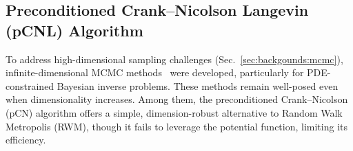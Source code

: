\subsection{Preconditioned Crank–Nicolson Langevin (pCNL) Algorithm}
\label{sec:methods:pcn}
To address high-dimensional sampling challenges (Sec.~\ref{sec:backgounds:mcmc}), infinite-dimensional MCMC methods~\cite{Cotter_2013pcnl, Beskos_2017geometricMCMC, doi:10.1142/S0219493708002378pcnlDiffusionBridge} were developed, particularly for PDE-constrained Bayesian inverse problems. These methods remain well-posed even when dimensionality increases. Among them, the preconditioned Crank–Nicolson (pCN) algorithm offers a simple, dimension-robust alternative to Random Walk Metropolis (RWM), though it fails to leverage the potential function, limiting its efficiency.

